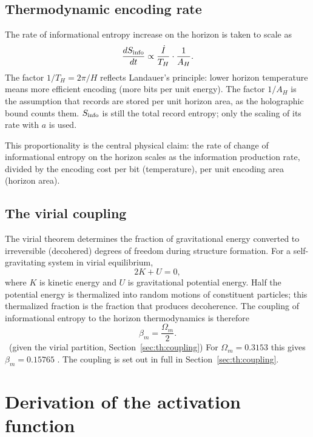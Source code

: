 \subsection{Thermodynamic encoding rate}
The rate of informational entropy increase on the horizon is taken to scale as
\begin{equation}\frac{dS_{\rm info}}{dt}\propto\frac{\dot I}{T_H}\cdot\frac{1}{A_H}.\label{eq:dSdt}\end{equation}
The factor $1/T_H=2\pi/H$ reflects Landauer's principle: lower horizon temperature means more efficient encoding (more bits per unit energy). The factor
$1/A_H$ is the assumption that records are stored per unit horizon area, as the holographic bound counts them. $S_{\rm info}$ is still the total
record entropy; only the scaling of its rate with $a$ is used.

This proportionality is the central physical claim: the rate of change of informational entropy on the horizon scales as the information production rate,
divided by the encoding cost per bit (temperature), per unit encoding area (horizon area). \conjecture

\subsection{The virial coupling}
The virial theorem determines the fraction of gravitational energy converted to irreversible (decohered) degrees of freedom during structure formation.
For a self-gravitating system in virial equilibrium,
\begin{equation}2K+U=0,\label{eq:th:virial}\end{equation}
where $K$ is kinetic energy and $U$ is gravitational potential energy. Half the potential energy is thermalized into random motions of constituent
particles; this thermalized fraction is the fraction that produces decoherence. The coupling of informational entropy to the horizon thermodynamics is
therefore
\begin{equation}\beta_m=\frac{\Omega_m}{2}.\label{eq:th:beta}\end{equation}
\derived\ (given the virial partition, Section~\ref{sec:th:coupling}) For $\Omega_m=0.3153$ this gives $\beta_m=0.15765$ \calc. The coupling is set out in full in
Section~\ref{sec:th:coupling}.

\section{Derivation of the activation function}\label{sec:th:activation}
